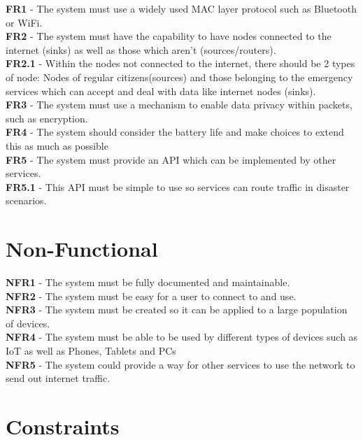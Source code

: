 \documentclass{report}
\begin{document}
\textbf{FR1} - The system must use a widely used MAC layer protocol such as Bluetooth or WiFi.\\
\textbf{FR2} - The system must have the capability to have nodes connected to the internet (sinks) as well as those which aren't (sources/routers).\\
\textbf{FR2.1} - Within the nodes not connected to the internet, there should be 2 types of node: Nodes of regular citizens(sources) and those belonging to the emergency services 
which can accept and deal with data like internet nodes (sinks).\\
\textbf{FR3} - The system must use a mechanism to enable data privacy within packets, such as encryption.\\
\textbf{FR4} - The system should consider the battery life and make choices to extend this as much as possible\\
\textbf{FR5} - The system must provide an API which can be implemented by other services.\\
\textbf{FR5.1} - This API must be simple to use so services can route traffic in disaster scenarios.\\

\section*{Non-Functional}

\textbf{NFR1} - The system must be fully documented and maintainable.\\
\textbf{NFR2} - The system must be easy for a user to connect to and use.\\
\textbf{NFR3} - The system must be created so it can be applied to a large population of devices.\\
\textbf{NFR4} - The system must be able to be used by different types of devices such as IoT as well as Phones, Tablets and PCs\\
\textbf{NFR5} - The system could provide a way for other services to use the network to send out internet traffic.\\

\section*{Constraints}
\end{document}
